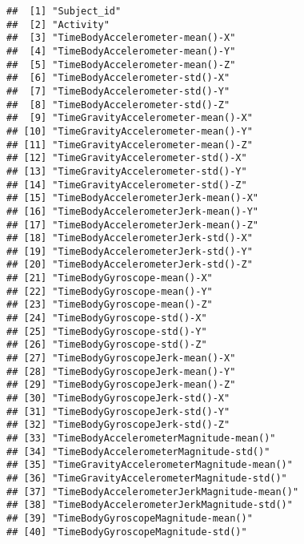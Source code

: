 \documentclass[
]{article}
\begin{document}
\begin{verbatim}
##  [1] "Subject_id"                                            
##  [2] "Activity"                                              
##  [3] "TimeBodyAccelerometer-mean()-X"                        
##  [4] "TimeBodyAccelerometer-mean()-Y"                        
##  [5] "TimeBodyAccelerometer-mean()-Z"                        
##  [6] "TimeBodyAccelerometer-std()-X"                         
##  [7] "TimeBodyAccelerometer-std()-Y"                         
##  [8] "TimeBodyAccelerometer-std()-Z"                         
##  [9] "TimeGravityAccelerometer-mean()-X"                     
## [10] "TimeGravityAccelerometer-mean()-Y"                     
## [11] "TimeGravityAccelerometer-mean()-Z"                     
## [12] "TimeGravityAccelerometer-std()-X"                      
## [13] "TimeGravityAccelerometer-std()-Y"                      
## [14] "TimeGravityAccelerometer-std()-Z"                      
## [15] "TimeBodyAccelerometerJerk-mean()-X"                    
## [16] "TimeBodyAccelerometerJerk-mean()-Y"                    
## [17] "TimeBodyAccelerometerJerk-mean()-Z"                    
## [18] "TimeBodyAccelerometerJerk-std()-X"                     
## [19] "TimeBodyAccelerometerJerk-std()-Y"                     
## [20] "TimeBodyAccelerometerJerk-std()-Z"                     
## [21] "TimeBodyGyroscope-mean()-X"                            
## [22] "TimeBodyGyroscope-mean()-Y"                            
## [23] "TimeBodyGyroscope-mean()-Z"                            
## [24] "TimeBodyGyroscope-std()-X"                             
## [25] "TimeBodyGyroscope-std()-Y"                             
## [26] "TimeBodyGyroscope-std()-Z"                             
## [27] "TimeBodyGyroscopeJerk-mean()-X"                        
## [28] "TimeBodyGyroscopeJerk-mean()-Y"                        
## [29] "TimeBodyGyroscopeJerk-mean()-Z"                        
## [30] "TimeBodyGyroscopeJerk-std()-X"                         
## [31] "TimeBodyGyroscopeJerk-std()-Y"                         
## [32] "TimeBodyGyroscopeJerk-std()-Z"                         
## [33] "TimeBodyAccelerometerMagnitude-mean()"                 
## [34] "TimeBodyAccelerometerMagnitude-std()"                  
## [35] "TimeGravityAccelerometerMagnitude-mean()"              
## [36] "TimeGravityAccelerometerMagnitude-std()"               
## [37] "TimeBodyAccelerometerJerkMagnitude-mean()"             
## [38] "TimeBodyAccelerometerJerkMagnitude-std()"              
## [39] "TimeBodyGyroscopeMagnitude-mean()"                     
## [40] "TimeBodyGyroscopeMagnitude-std()"                      

\end{verbatim}
\end{document}
